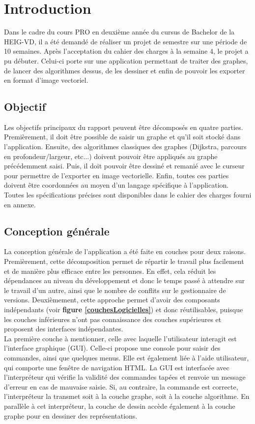 \documentclass[french]{article}
\begin{document}
	\section{Introduction}
	Dans le cadre du cours PRO en deuxième année du cursus de Bachelor de la HEIG-VD, il a été demandé de réaliser un projet de semestre sur une période de 10 semaines. Après l'acceptation du cahier des charges à la semaine 4, le projet a pu débuter. Celui-ci porte sur une application permettant de traiter des graphes, de lancer des algorithmes dessus, de les dessiner et enfin de pouvoir les exporter en format d'image vectoriel.
	
		\subsection{Objectif}
		Les objectifs principaux du rapport peuvent être décomposés en quatre parties. Premièrement, il doit être possible de saisir un graphe et qu'il soit stocké dans l'application. Ensuite, des algorithmes classiques des graphes (Dijkstra, parcours en profondeur/largeur, etc...) doivent pouvoir être appliqués au graphe précédemment saisi. Puis, il doit pouvoir être dessiné et remanié avec le curseur pour permettre de l'exporter en image vectorielle. Enfin, toutes ces parties doivent être coordonnées au moyen d'un langage spécifique à l'application.\\
		Toutes les spécifications précises sont disponibles dans le cahier des charges fourni en annexe.
		
		\subsection{Conception générale}
		La conception générale de l'application a été faite en couches pour deux raisons. Premièrement, cette décomposition permet de répartir le travail plus facilement et de manière plus efficace entre les personnes. En effet, cela réduit les dépendances au niveau du développement et donc le temps passé à attendre sur le travail d'un autre, ainsi que le nombre de conflits sur le gestionnaire de versions. Deuxièmement, cette approche permet d'avoir des composants indépendants (voir \textbf{figure \ref{couchesLogicielles}}) et donc réutilisables, puisque les couches inférieures n'ont pas connaissance des couches supérieures et proposent des interfaces indépendantes.\\
		La première couche à mentionner, celle avec laquelle l'utilisateur interagit est l'interface graphique (GUI). Celle-ci propose une console pour saisir des commandes, ainsi que quelques menus. Elle est également liée à l'aide utilisateur, qui comporte une fenêtre de navigation HTML. La GUI est interfacée avec l'interpréteur qui vérifie la validité des commandes tapées et renvoie un message d'erreur en cas de mauvaise saisie. Si, au contraire, la commande est correcte, l'interpréteur la transmet soit à la couche graphe, soit à la couche algorithme. En parallèle à cet interpréteur, la couche de dessin accède également à la couche graphe pour en dessiner des représentations.
		
\end{document}
